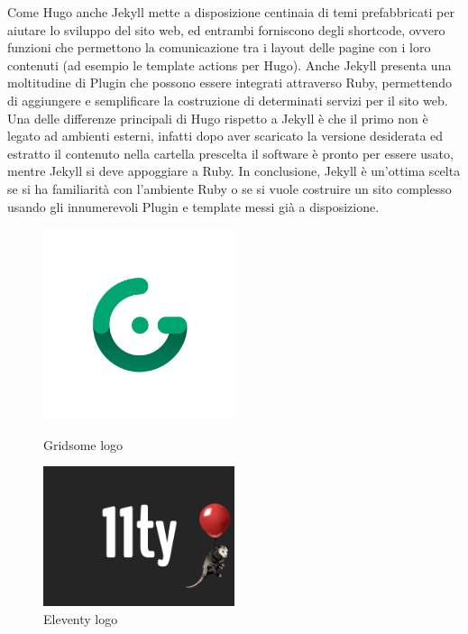 \documentclass[target=bach,aauheader=]{thud}
\begin{document}
Come Hugo anche Jekyll mette a disposizione centinaia di temi prefabbricati per aiutare lo sviluppo del sito web, ed entrambi forniscono degli shortcode, ovvero funzioni che permettono la comunicazione tra i layout delle pagine con i loro contenuti (ad esempio le template actions per Hugo).
Anche Jekyll presenta una moltitudine di Plugin che possono essere integrati attraverso Ruby, permettendo di aggiungere e semplificare la costruzione di determinati servizi per il sito web. \newline
Una delle differenze principali di Hugo rispetto a Jekyll è che il primo non è legato ad ambienti esterni, infatti dopo aver scaricato la versione desiderata ed estratto il contenuto nella cartella prescelta il software è pronto per essere usato, mentre Jekyll si deve appoggiare a Ruby.
\newline
In conclusione, Jekyll è un'ottima scelta se si ha familiarità con l'ambiente Ruby o se si vuole costruire un sito complesso usando gli innumerevoli Plugin e template messi già a disposizione. 


\begin{figure}[t]
    \begin{minipage}[t]{0.5\textwidth}
      \centering
      \includegraphics[width=0.5\textwidth]{images/Gridsome-logo.png}
      \caption{Gridsome logo}
    \end{minipage}%
    \hfill
    \begin{minipage}[t]{0.5\textwidth}
      \centering
      \includegraphics[width=0.5\textwidth]{images/Eleventy_logo.png}
      \caption{Eleventy logo}
    \end{minipage}
\end{figure}
\end{document}
